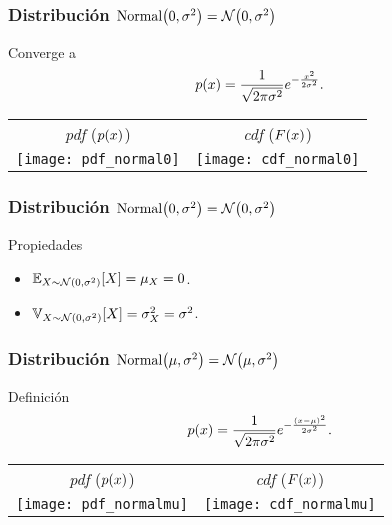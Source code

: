 \documentclass[table]{beamer}
\begin{document}
\begin{frame}
    \frametitle{Distribución $\text{Normal} \parens{0, \sigma^{2}} = \normal{0}{\sigma^{2}}$}
    \begin{block}{Converge a}
        \begin{equation*}
            \pdf{x} = \frac{1}{\sqrt{2 \pi \sigma^{2}}} e^{- \frac{x^{2}}{2 \sigma^{2}}} .
        \end{equation*}
    \end{block}
    \begin{center}
        \begin{tabular}{cc}
            \emph{pdf} ($\pdf{x}$) & \emph{cdf} ($\FF{x}$) \\
            \texttt{[image: pdf\_normal0]} &
            \texttt{[image: cdf\_normal0]}
        \end{tabular}
    \end{center}
    
\end{frame}

\fi

\begin{frame}
    \frametitle{Distribución $\text{Normal} \parens{0, \sigma^{2}} = \normal{0}{\sigma^{2}}$}
        \begin{block}{Propiedades}
        \begin{itemize}
            \item $\expecteddist{X \sim \normal{0}{\sigma^{2}}}{X} = \mu_{X} = 0$.
            \item $\variancedist{X \sim \normal{0}{\sigma^{2}}}{X} = \sigma^{2}_{X} = \sigma^{2}$.
        \end{itemize}
    \end{block}
\end{frame}

\begin{frame}
    \frametitle{Distribución $\text{Normal} \parens{\mu, \sigma^{2}} = \normal{\mu}{\sigma^{2}}$}
    \begin{block}{Definición}
        \begin{equation*}
            \pdf{x} = \frac{1}{\sqrt{2 \pi \sigma^{2}}} e^{- \frac{\parens{x - \mu}^{2}}{2 \sigma^{2}}} .
        \end{equation*}
    \end{block}
    \begin{center}
        \begin{tabular}{cc}
            \emph{pdf} ($\pdf{x}$) & \emph{cdf} ($\FF{x}$) \\
            \texttt{[image: pdf\_normalmu]} &
            \texttt{[image: cdf\_normalmu]}
        \end{tabular}
    \end{center}
\end{frame}
\end{document}
